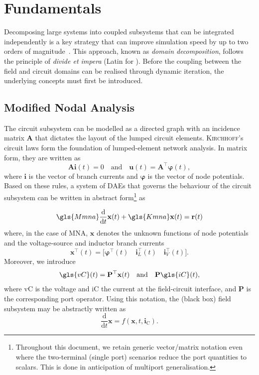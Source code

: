 
\chapter{Fundamentals} \label{ch:fundamentals}
Decomposing large systems into coupled subsystems that can be integrated independently is a key strategy that can improve simulation speed by up to two orders of magnitude~\cite{Gomes2017}. This approach, known as \textit{domain decomposition}, follows the principle of \textit{divide et impera} (Latin for ). Before the coupling between the field and circuit domains can be realised through dynamic iteration, the underlying concepts must first be introduced.

\section{Modified Nodal Analysis}
The circuit subsystem can be modelled as a directed graph with an incidence matrix $\mathbf{A}$ that dictates the layout of the lumped circuit elements. \textsc{Kirchhoff}'s circuit laws form the foundation of lumped-element network analysis. In matrix form, they are written as
\begin{equation*}
    \mathbf{A} \mathbf{i}(t) = 0 \quad \text{and} \quad \mathbf{u}(t) = \mathbf{A}^\top \mathbf{\varphi}(t),
\end{equation*}
where $\mathbf{i}$ is the vector of branch currents and $\mathbf{\varphi}$ is the vector of node potentials.
Based on these rules, a system of DAEs that governs the behaviour of the circuit subsystem can be written in abstract form\footnote{Throughout this document, we retain generic vector/matrix notation even where the two-terminal (single port) scenarios reduce the port quantities to scalars. This is done in anticipation of multiport generalisation.} as

\begin{equation*}
    \gls{Mmna} \frac{\textrm{d}}{\textrm{d}t} \mathbf{x}(t) + \gls{Kmna} \mathbf{x}(t) = \mathbf{r}(t) \label{eq:mna-base}
\end{equation*}
where, in the case of MNA, $\mathbf{x}$ denotes the unknown functions of node potentials and the voltage-source and inductor branch currents
\begin{equation*}
    \mathbf{x}^\top(t) = \lbrack \mathbf{\varphi}^\top(t) \quad \mathbf{i}_L^\top(t) \quad \mathbf{i}_V^\top(t) \rbrack.
\end{equation*}
Moreover, we introduce
\begin{equation*}
    \gls{vC}(t) = \mathbf{P}^\top \mathbf{x}(t) \label{eq:mna-circuit-port-operator} \quad \text{and} \quad \mathbf{P}\gls{iC}(t),
\end{equation*}
where \gls{vC} is the voltage and \gls{iC} the current at the field-circuit interface, and $\mathbf{P}$ is the corresponding port operator.
Using this notation, the (black box) field subsystem may be abstractly written as
\begin{equation*}
    \frac{\mathrm{d}}{\mathrm{d}t}\mathbf{x} = f(\mathbf{x},t,\mathbf{i}_{\text{C}}).
\end{equation*}

